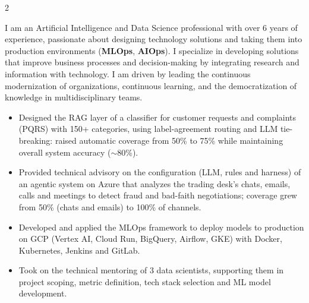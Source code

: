 \documentclass[10pt,a4paper,ragged2e,withhyper]{altacv}
\begin{document}
\begin{paracol}{2}


I am an Artificial Intelligence and Data Science professional with over 6 years of experience, passionate about designing technology solutions and taking them into production environments (\textbf{MLOps}, \textbf{AIOps}). I specialize in developing solutions that improve business processes and decision-making by integrating research and information with technology. I am driven by leading the continuous modernization of organizations, continuous learning, and the democratization of knowledge in multidisciplinary teams.



\begin{itemize}
\item Designed the RAG layer of a classifier for customer requests and complaints (PQRS) with 150+ categories, using label-agreement routing and LLM tie-breaking: raised automatic coverage from 50\% to 75\% while maintaining overall system accuracy (${\sim}$80\%).
\item Provided technical advisory on the configuration (LLM, rules and harness) of an agentic system on Azure that analyzes the trading desk's chats, emails, calls and meetings to detect fraud and \mbox{bad-faith} negotiations; coverage grew from 50\% (chats and emails) to 100\% of channels.
\item Developed and applied the MLOps framework to deploy models to production on GCP (Vertex AI, Cloud Run, BigQuery, Airflow, GKE) with Docker, Kubernetes, Jenkins and GitLab.
\item Took on the technical mentoring of 3 data scientists, supporting them in project scoping, metric definition, tech stack selection and ML model development.
\end{itemize}

\divider



\end{paracol}
\end{document}
